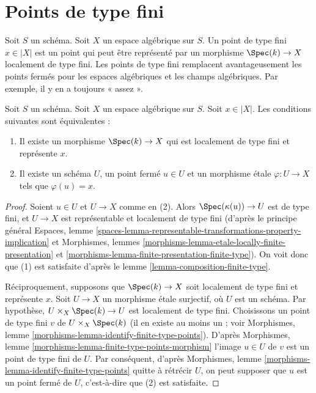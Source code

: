 \section{Points de type fini}
\label{section-points-finite-type}

\noindent
Soit $S$ un schéma. Soit $X$ un espace algébrique sur $S$.
Un point de type fini $x \in |X|$ est un point qui peut être représenté par
un morphisme $\Spec(k) \to X$ localement de type fini.
Les points de type fini remplacent avantageusement les points fermés pour les espaces
algébriques et les champs algébriques. Par exemple, il y en a toujours « assez ».

\begin{lemma}
\label{lemma-point-finite-type}
Soit $S$ un schéma. Soit $X$ un espace algébrique sur $S$.
Soit $x \in |X|$. Les conditions suivantes sont équivalentes :
\begin{enumerate}
\item Il existe un morphisme $\Spec(k) \to X$
qui est localement de type fini et représente $x$.
\item Il existe un schéma $U$, un point fermé $u \in U$ et un morphisme étale
$\varphi : U \to X$ tels que $\varphi(u) = x$.
\end{enumerate}
\end{lemma}

\begin{proof}
Soient $u \in U$ et $U \to X$ comme en (2). Alors
$\Spec(\kappa(u)) \to U$ est de type fini, et $U \to X$ est
représentable et localement de type fini (d'après le principe général
Espaces, lemme
\ref{spaces-lemma-representable-transformations-property-implication}
et
Morphismes, lemmes \ref{morphisms-lemma-etale-locally-finite-presentation} et
\ref{morphisms-lemma-finite-presentation-finite-type}). On voit donc
que (1) est satisfaite d'après le
lemme \ref{lemma-composition-finite-type}.

\medskip\noindent
Réciproquement, supposons que $\Spec(k) \to X$ soit localement de type fini et
représente $x$. Soit $U \to X$ un morphisme étale surjectif, où $U$
est un schéma. Par hypothèse, $U \times_X \Spec(k) \to U$ est localement
de type fini. Choisissons un point de type fini $v$ de
$U \times_X \Spec(k)$ (il en existe au moins un ; voir
Morphismes, lemme \ref{morphisms-lemma-identify-finite-type-points}).
D'après
Morphismes, lemme \ref{morphisms-lemma-finite-type-points-morphism}
l'image $u \in U$ de $v$ est un point de type fini de $U$.
Par conséquent, d'après
Morphismes, lemme \ref{morphisms-lemma-identify-finite-type-points}
quitte à rétrécir $U$, on peut supposer que $u$ est un point fermé de $U$, c'est-à-dire que
(2) est satisfaite.
\end{proof}


